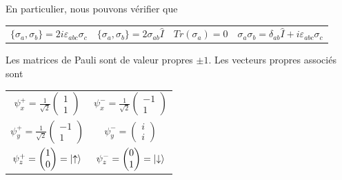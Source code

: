 \documentclass[../notesdecours.tex]{subfiles}
\begin{document}
En particulier, nous pouvons vérifier que 
\begin{center}
    \begin{tabular}{c|c|c|c}
        $\{\sigma_a,\sigma_b\} = 2i\varepsilon_{abc}\sigma_c$ & $\{\sigma_a,\sigma_b\} = 2\sigma_{ab}\hat{I}$ & $Tr(\sigma_a) = 0$ & $\sigma_a\sigma_b = \delta_{ab}\hat{I}+i\varepsilon_{abc}\sigma_c$
    \end{tabular}
\end{center}

Les matrices de Pauli sont de valeur propres $\pm 1$. Les vecteurs propres associés sont
\begin{center}
    \begin{tabular}{c|c}
        $\psi_x^+ = \frac{1}{\sqrt{2}} \begin{pmatrix}
            1\\
            1
        \end{pmatrix}$ & $\psi_x^- = \frac{1}{\sqrt{2}} \begin{pmatrix}
            -1\\
            1
        \end{pmatrix}$\\
        $\psi_y^+ = \frac{1}{\sqrt{2}} \begin{pmatrix}
            -1\\
            1
        \end{pmatrix}$ & $\psi_y^- = \begin{pmatrix}
            i\\
            i
        \end{pmatrix}$\\
        $\psi_z^+ = \begin{pmatrix}
            1\\
            0
        \end{pmatrix} = \ket{\uparrow}$ & $\psi_z^- = \begin{pmatrix}
            0\\
            1
        \end{pmatrix} = \ket{\downarrow}$
    \end{tabular}
\end{center}
\end{document}
